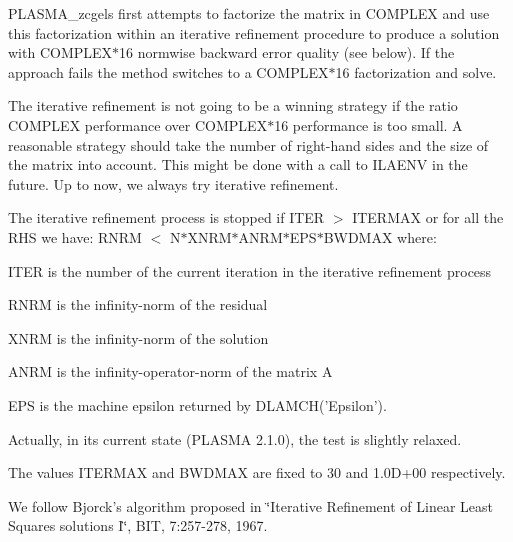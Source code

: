 PLASMA\_\-zcgels first attempts to factorize the matrix in COMPLEX and use this factorization within an iterative refinement procedure to produce a solution with COMPLEX$\ast$16 normwise backward error quality (see below). If the approach fails the method switches to a COMPLEX$\ast$16 factorization and solve.

The iterative refinement is not going to be a winning strategy if the ratio COMPLEX performance over COMPLEX$\ast$16 performance is too small. A reasonable strategy should take the number of right-\/hand sides and the size of the matrix into account. This might be done with a call to ILAENV in the future. Up to now, we always try iterative refinement.

The iterative refinement process is stopped if ITER $>$ ITERMAX or for all the RHS we have: RNRM $<$ N$\ast$XNRM$\ast$ANRM$\ast$EPS$\ast$BWDMAX where:


\begin{DoxyItemize}
\item ITER is the number of the current iteration in the iterative refinement process
\item RNRM is the infinity-\/norm of the residual
\item XNRM is the infinity-\/norm of the solution
\item ANRM is the infinity-\/operator-\/norm of the matrix A
\item EPS is the machine epsilon returned by DLAMCH('Epsilon').
\end{DoxyItemize}

Actually, in its current state (PLASMA 2.1.0), the test is slightly relaxed.

The values ITERMAX and BWDMAX are fixed to 30 and 1.0D+00 respectively.

We follow Bjorck's algorithm proposed in \char`\"{}Iterative Refinement of Linear
  Least Squares solutions I\char`\"{}, BIT, 7:257-\/278, 1967.


